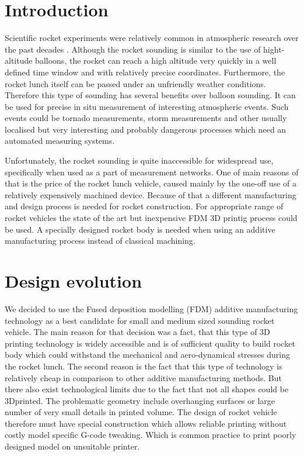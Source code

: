 \documentclass{poster16}
\begin{document}
\section{Introduction}

Scientific rocket experiments were relatively common in atmospheric research over the past decades \cite{rocket_sounding}. Although the rocket sounding is similar to the use of hight-altitude balloons, the rocket can reach a high altitude very quickly in a well defined time window and with relatively precise coordinates. Furthermore, the rocket lunch itself can be passed under an  unfriendly weather conditions. Therefore this type of sounding has several benefits over balloon sounding. It can be used for precise in situ measurement of interesting atmospheric events. Such events could be tornado measurements, storm measurements and other usually localised but very interesting and probably dangerous processes which need an automated measuring systems. 

Unfortunately, the rocket sounding is quite inaccessible for widespread use, specifically when used as a part of measurement networks. One of main reasons of that is the price of the rocket lunch vehicle, caused mainly by the one-off use of a relatively expensively machined device. 
Because of that a different manufacturing and design process is needed for rocket construction. 
For appropriate range of rocket vehicles the state of the art but inexpensive FDM 3D printig process could be used. A specially designed rocket body is needed when using an additive manufacturing process instead of classical machining. 

\section{Design evolution}

We decided to use the Fused deposition modelling (FDM) additive manufacturing technology as a best candidate for small and medium sized sounding rocket vehicle. The main reason for that decision was a fact, that this type of 3D printing technology is widely accessible and is of sufficient quality to build rocket body which could withstand the mechanical and aero-dynamical stresses during the rocket lunch. The second reason is the fact that this type of technology is relatively  cheap in comparison to other additive manufacturing methods. 
But there also exist technological limits due to the fact that not all shapes could be 3Dprinted. The problematic geometry include overhanging surfaces or large number of very small details in printed volume. 
The design of rocket vehicle therefore must have special construction which allows reliable printing without costly model specific G-code tweaking. Which is common practice to print poorly designed model on unsuitable printer. 
\end{document}
